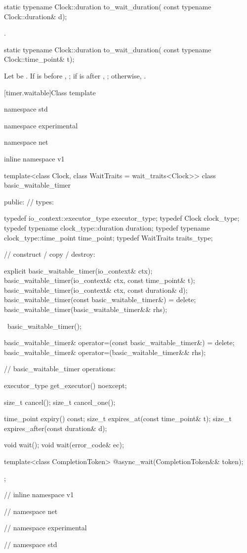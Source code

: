 \begin{itemdecl}
static typename Clock::duration to_wait_duration(
  const typename Clock::duration& d);
\end{itemdecl}

\begin{itemdescr}
\pnum
\returns {}.
\end{itemdescr}

\begin{itemdecl}
static typename Clock::duration to_wait_duration(
  const typename Clock::time_point& t);
\end{itemdecl}

\begin{itemdescr}
\pnum
\returns Let  be . If  is before , ; if  is after , ; otherwise, .
\end{itemdescr}



[timer.waitable]{Class template }

\begin{codeblock}
namespace std {
namespace experimental {
namespace net {
inline namespace v1 {

  template<class Clock, class WaitTraits = wait_traits<Clock>>
  class basic_waitable_timer
  {
  public:
    // types:

    typedef io_context::executor_type executor_type;
    typedef Clock clock_type;
    typedef typename clock_type::duration duration;
    typedef typename clock_type::time_point time_point;
    typedef WaitTraits traits_type;

    // construct / copy / destroy:

    explicit basic_waitable_timer(io_context& ctx);
    basic_waitable_timer(io_context& ctx, const time_point& t);
    basic_waitable_timer(io_context& ctx, const duration& d);
    basic_waitable_timer(const basic_waitable_timer&) = delete;
    basic_waitable_timer(basic_waitable_timer&& rhs);

    ~basic_waitable_timer();

    basic_waitable_timer& operator=(const basic_waitable_timer&) = delete;
    basic_waitable_timer& operator=(basic_waitable_timer&& rhs);

    // basic_waitable_timer operations:

    executor_type get_executor() noexcept;

    size_t cancel();
    size_t cancel_one();

    time_point expiry() const;
    size_t expires_at(const time_point& t);
    size_t expires_after(const duration& d);

    void wait();
    void wait(error_code& ec);

    template<class CompletionToken>
      @\DEDUCED@ async_wait(CompletionToken&& token);
  };

} // inline namespace v1
} // namespace net
} // namespace experimental
} // namespace std
\end{codeblock}

